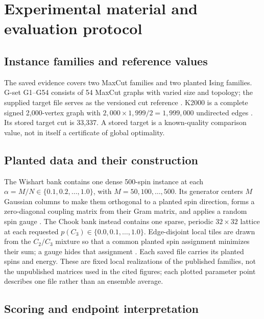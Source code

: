 \section{Experimental material and evaluation protocol}
\label{sec:experiments}

\subsection{Instance families and reference values}

The saved evidence covers two MaxCut families and two planted Ising
families. G-set
G1--G54 consists of 54 MaxCut graphs with varied size and topology; the
supplied target file serves as the versioned cut reference
\citep{yeGset}. K2000 is a complete signed 2,000-vertex graph with
$2{,}000\times1{,}999/2=1{,}999{,}000$ undirected edges
\citep{inagaki2016science}. Its stored target cut is 33,337. A stored
target is a known-quality comparison value, not in itself a certificate of
global optimality.

\subsection{Planted data and their construction}

The Wishart bank contains one dense 500-spin instance at each
$\alpha=M/N\in\{0.1,0.2,\ldots,1.0\}$, with $M=50,100,\ldots,500$.
Its generator centers $M$ Gaussian columns to make them orthogonal to a
planted spin direction, forms a zero-diagonal coupling matrix from their
Gram matrix, and applies a random spin gauge \citep{hamze2020}. The Chook
bank instead contains one sparse, periodic $32\times32$ lattice at each
requested $p(C_3)\in\{0.0,0.1,\ldots,1.0\}$. Edge-disjoint local tiles
are drawn from the $C_2/C_3$ mixture so that a common planted spin
assignment minimizes their sum; a gauge hides that assignment
\citep{perera2020}. Each saved file carries its planted spins and energy.
These are fixed local realizations of the published families, not the
unpublished matrices used in the cited figures; each plotted parameter
point describes one file rather than an ensemble average.

\subsection{Scoring and endpoint interpretation}

